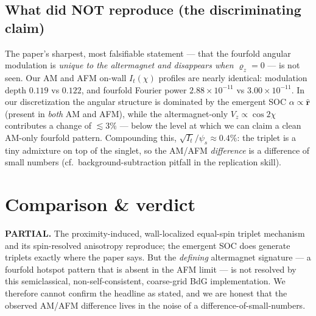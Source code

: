 \documentclass[11pt]{article}
\begin{document}
\subsection{What did NOT reproduce (the discriminating claim)}
The paper's sharpest, most falsifiable statement --- that the fourfold angular
modulation is \emph{unique to the altermagnet and disappears when $\varrho_z=0$}
--- is not seen. Our AM and AFM on-wall $I_t(\chi)$ profiles are nearly identical:
modulation depth $0.119$ vs $0.122$, and fourfold Fourier power
$2.88\times10^{-11}$ vs $3.00\times10^{-11}$. In our discretization the angular
structure is dominated by the emergent SOC $\alpha\propto\hat{\mathbf r}$ (present
in \emph{both} AM and AFM), while the altermagnet-only $V_z\propto\cos2\chi$
contributes a change of $\lesssim3\%$ --- below the level at which we can claim a
clean AM-only fourfold pattern. Compounding this, $\sqrt{I_t}/\psi_s\approx0.4\%$:
the triplet is a tiny admixture on top of the singlet, so the AM/AFM
\emph{difference} is a difference of small numbers (cf.\ background-subtraction
pitfall in the replication skill).

\section{Comparison \& verdict}
\textbf{PARTIAL.} The proximity-induced, wall-localized equal-spin triplet
mechanism and its spin-resolved anisotropy reproduce; the emergent SOC does
generate triplets exactly where the paper says. But the \emph{defining} altermagnet
signature --- a fourfold hotspot pattern that is absent in the AFM limit --- is not
resolved by this semiclassical, non-self-consistent, coarse-grid BdG
implementation. We therefore cannot confirm the headline as stated, and we are
honest that the observed AM/AFM difference lives in the noise of a
difference-of-small-numbers.
\end{document}
